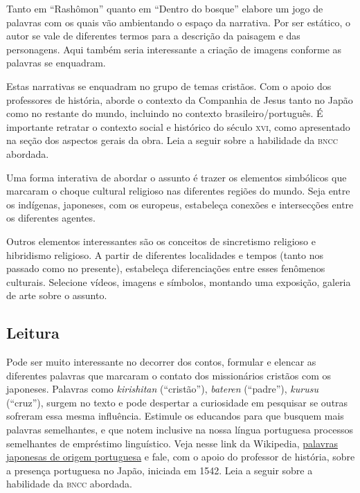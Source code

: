 \documentclass[12pt]{extarticle}
\begin{document}
Tanto em ``Rashômon'' quanto em ``Dentro do bosque'' elabore um jogo de palavras com os
quais vão ambientando o espaço da narrativa. Por ser estático, o autor se vale
de diferentes termos para a descrição da paisagem e das personagens. Aqui
também seria interessante a criação de imagens conforme as palavras se
enquadram.

Estas narrativas se enquadram no grupo de temas cristãos. Com o apoio dos professores
de história, aborde o
contexto da Companhia de Jesus tanto no Japão como no restante do mundo,
incluindo no contexto brasileiro/português. É importante retratar o contexto
social e histórico do século \textsc{xvi}, como apresentado na seção dos
aspectos gerais da obra.
Leia a seguir sobre a habilidade da \textsc{bncc} abordada.

Uma forma interativa de abordar o assunto é trazer os elementos simbólicos que
marcaram o choque cultural religioso nas diferentes regiões do mundo. Seja
entre os indígenas, japoneses, com os europeus, estabeleça conexões e
intersecções entre os diferentes agentes.

Outros elementos interessantes são os conceitos de sincretismo religioso e
hibridismo religioso. A partir de diferentes localidades e tempos (tanto nos
passado como no presente), estabeleça diferenciações entre esses fenômenos
culturais. Selecione vídeos, imagens e símbolos, montando uma exposição,
galeria de arte sobre o assunto.

\subsection{Leitura}

Pode ser muito interessante no decorrer dos contos, formular e elencar as diferentes
palavras que marcaram o contato dos missionários cristãos com os japoneses.
Palavras como \textit{kirishitan} (``cristão''), \textit{bateren} (``padre''), 
\textit{kurusu} (``cruz''),
surgem no texto e pode despertar a curiosidade em pesquisar se outras sofreram
essa mesma influência.  Estimule os educandos para que busquem mais palavras semelhantes, 
e que notem inclusive na nossa língua portuguesa processos semelhantes de empréstimo
linguístico. Veja nesse link da Wikipedia, \href{https://pt.wikipedia.org/wiki/Palavras_japonesas_de_origem_portuguesa}{palavras japonesas de origem 
portuguesa} e fale, com o apoio do professor de história, sobre a presença portuguesa no Japão, iniciada
em 1542.
Leia a seguir sobre a habilidade da \textsc{bncc} abordada.
\end{document}
